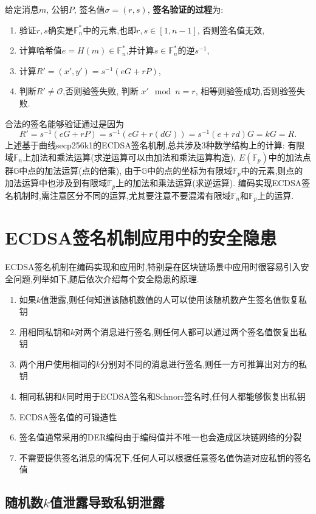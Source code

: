 \documentclass{article}
\renewcommand{\G}{\mathbb{G}}
\newcommand{\F}{\mathbb{F}}
\begin{document}
给定消息$m$, 公钥$P$, 签名值$\sigma = (r, s)$, \textbf{签名验证的过程}为:
\begin{enumerate}
\item  验证$r, s$确实是$\F_n^*$中的元素,也即$r, s \in [1, n-1]$, 否则签名值无效,
\item 计算哈希值$e=H(m)\in\F_n^*$,并计算$s\in\F_n^*$的逆$s^{-1}$,
\item  计算$R' = (x', y') = s^{-1}(eG + rP)$, 
\item 判断$R' \neq \mathcal{O}$,否则验签失败, 判断 $x' \mod n = r$, 相等则验签成功,否则验签失败.
\end{enumerate}
合法的签名能够验证通过是因为
$$R' = s^{-1}(eG + rP) = s^{-1}(eG + r(dG)) = s^{-1}(e+rd)G = kG = R.$$
上述基于曲线secp256k1的ECDSA签名机制,总共涉及3种数学结构上的计算:
有限域$\F_n$上加法和乘法运算(求逆运算可以由加法和乘法运算构造), $E(\F_p)$中的加法点群$\G$中点的加法运算(点的倍乘),
由于$\G$中的点的坐标为有限域$\F_p$中的元素,则点的加法运算中也涉及到有限域$\F_p$上的加法和乘法运算(求逆运算).
编码实现ECDSA签名机制时,需注意区分不同的运算,尤其要注意不要混淆有限域$\F_n$和$\F_p$上的运算.

\section{ECDSA签名机制应用中的安全隐患}

ECDSA签名机制在编码实现和应用时,特别是在区块链场景中应用时很容易引入安全问题,列举如下,随后依次介绍每个安全隐患的原理.
\begin{enumerate}
\item 如果$k$值泄露,则任何知道该随机数值的人可以使用该随机数产生签名值恢复私钥
\item 用相同私钥和$k$对两个消息进行签名,则任何人都可以通过两个签名值恢复出私钥
\item 两个用户使用相同的$k$分别对不同的消息进行签名,则任一方可推算出对方的私钥
\item 相同私钥和$k$同时用于ECDSA签名和Schnorr签名时,任何人都能够恢复出私钥
\item ECDSA签名值的可锻造性
\item 签名值通常采用的DER编码由于编码值并不唯一也会造成区块链网络的分裂
\item 不需要提供签名消息的情况下,任何人可以根据任意签名值伪造对应私钥的签名值
\end{enumerate}

\subsection{随机数$k$值泄露导致私钥泄露}
\end{document}
